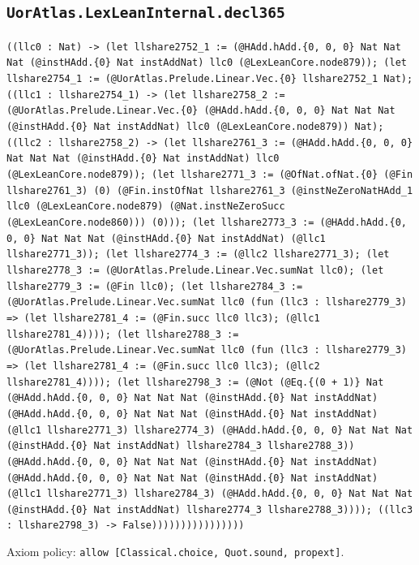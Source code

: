 \documentclass[11pt]{article}
\begin{document}
\subsection*{\texttt{UorAtlas.LexLeanInternal.decl365}}
\noindent\texttt{((llc0 : Nat) -> (let llshare2752\_1 := (@HAdd.hAdd.\{0, 0, 0\} Nat Nat Nat (@instHAdd.\{0\} Nat instAddNat) llc0 (@LexLeanCore.node879)); (let llshare2754\_1 := (@UorAtlas.Prelude.Linear.Vec.\{0\} llshare2752\_1 Nat); ((llc1 : llshare2754\_1) -> (let llshare2758\_2 := (@UorAtlas.Prelude.Linear.Vec.\{0\} (@HAdd.hAdd.\{0, 0, 0\} Nat Nat Nat (@instHAdd.\{0\} Nat instAddNat) llc0 (@LexLeanCore.node879)) Nat); ((llc2 : llshare2758\_2) -> (let llshare2761\_3 := (@HAdd.hAdd.\{0, 0, 0\} Nat Nat Nat (@instHAdd.\{0\} Nat instAddNat) llc0 (@LexLeanCore.node879)); (let llshare2771\_3 := (@OfNat.ofNat.\{0\} (@Fin llshare2761\_3) (0) (@Fin.instOfNat llshare2761\_3 (@instNeZeroNatHAdd\_1 llc0 (@LexLeanCore.node879) (@Nat.instNeZeroSucc (@LexLeanCore.node860))) (0))); (let llshare2773\_3 := (@HAdd.hAdd.\{0, 0, 0\} Nat Nat Nat (@instHAdd.\{0\} Nat instAddNat) (@llc1 llshare2771\_3)); (let llshare2774\_3 := (@llc2 llshare2771\_3); (let llshare2778\_3 := (@UorAtlas.Prelude.Linear.Vec.sumNat llc0); (let llshare2779\_3 := (@Fin llc0); (let llshare2784\_3 := (@UorAtlas.Prelude.Linear.Vec.sumNat llc0 (fun (llc3 : llshare2779\_3) => (let llshare2781\_4 := (@Fin.succ llc0 llc3); (@llc1 llshare2781\_4)))); (let llshare2788\_3 := (@UorAtlas.Prelude.Linear.Vec.sumNat llc0 (fun (llc3 : llshare2779\_3) => (let llshare2781\_4 := (@Fin.succ llc0 llc3); (@llc2 llshare2781\_4)))); (let llshare2798\_3 := (@Not (@Eq.\{(0 + 1)\} Nat (@HAdd.hAdd.\{0, 0, 0\} Nat Nat Nat (@instHAdd.\{0\} Nat instAddNat) (@HAdd.hAdd.\{0, 0, 0\} Nat Nat Nat (@instHAdd.\{0\} Nat instAddNat) (@llc1 llshare2771\_3) llshare2774\_3) (@HAdd.hAdd.\{0, 0, 0\} Nat Nat Nat (@instHAdd.\{0\} Nat instAddNat) llshare2784\_3 llshare2788\_3)) (@HAdd.hAdd.\{0, 0, 0\} Nat Nat Nat (@instHAdd.\{0\} Nat instAddNat) (@HAdd.hAdd.\{0, 0, 0\} Nat Nat Nat (@instHAdd.\{0\} Nat instAddNat) (@llc1 llshare2771\_3) llshare2784\_3) (@HAdd.hAdd.\{0, 0, 0\} Nat Nat Nat (@instHAdd.\{0\} Nat instAddNat) llshare2774\_3 llshare2788\_3)))); ((llc3 : llshare2798\_3) -> False))))))))))))))))}\par
\noindent Axiom policy: \texttt{allow [Classical.choice, Quot.sound, propext]}.\par
\end{document}
